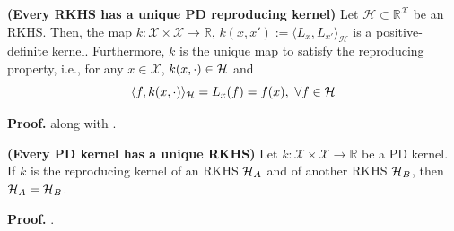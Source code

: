 \begin{proposition}
	\label{prop.unique_reprod_kernel}
	\textbf{(Every RKHS has a unique PD reproducing kernel)} 
	Let $\mathcal{H} \subset \mathbb{R}^\mathcal{X}$ be an RKHS. Then, the map $k: \mathcal{X} \times \mathcal{X} \rightarrow \mathbb{R}$, $k(x,x') := \langle L_x, L_{x'} \rangle_\mathcal{H}$ is a positive-definite kernel. Furthermore, $k$ is the unique map to satisfy the reproducing property, i.e., for any $x \in \mathcal{X}$, $k(x,\cdot) \in \mathcal{H}$ and
	\begin{equation}
		\rkinner{f}{k(x,\cdot)} = L_x(f) = f(x), \ \forall f \in \rkhs
		\label{eq.reproducing_property}
	\end{equation} 
\end{proposition}

\begin{my_proof}
	\textbf{Proof.}
	 \cite[Lemma~2]{berlinet2011reproducing} along with \citep[Theorem~4.20]{steinwart2008svm_book}.
\end{my_proof}

\begin{proposition}
	\label{prop.unique_rkhs}
	\textbf{(Every PD kernel has a unique RKHS)} 
	Let $k: \mathcal{X} \times \mathcal{X} \rightarrow \mathbb{R}$ be a PD kernel. If $k$ is the reproducing kernel of an RKHS $\mathcal{H}_A$ and of another RKHS $\mathcal{H}_B$, then $\mathcal{H}_A = \mathcal{H}_B$.
\end{proposition}

\begin{my_proof}
	\textbf{Proof.}
	\citep[Theorem~4.21]{steinwart2008svm_book}.
\end{my_proof}

